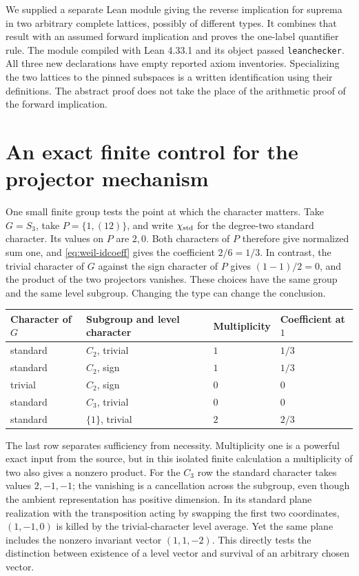 \documentclass[12pt,letterpaper]{article}
\begin{document}
We supplied a separate Lean module giving the reverse implication for suprema in two arbitrary complete lattices, possibly of different types. It combines that result with an assumed forward implication and proves the one-label quantifier rule. The module compiled with Lean 4.33.1 and its object passed \texttt{leanchecker}. All three new declarations have empty reported axiom inventories. Specializing the two lattices to the pinned subspaces is a written identification using their definitions. The abstract proof does not take the place of the arithmetic proof of the forward implication.


\section{An exact finite control for the projector mechanism}
\label{sec:weil-s3}

One small finite group tests the point at which the character matters. Take \(G=S_3\), take \(P=\{1,(12)\}\), and write \(\chi_{\rm std}\) for the degree-two standard character. Its values on \(P\) are \(2,0\). Both characters of \(P\) therefore give normalized sum one, and \eqref{eq:weil-idcoeff} gives the coefficient \(2/6=1/3\). In contrast, the trivial character of \(G\) against the sign character of \(P\) gives \((1-1)/2=0\), and the product of the two projectors vanishes. These choices have the same group and the same level subgroup. Changing the type can change the conclusion.

\begin{center}
\begin{tabular}{llll}
\hline
Character of \(G\)&Subgroup and level character&Multiplicity&Coefficient at \(1\)\\
\hline
standard&\(C_2\), trivial&\(1\)&\(1/3\)\\
standard&\(C_2\), sign&\(1\)&\(1/3\)\\
trivial&\(C_2\), sign&\(0\)&\(0\)\\
standard&\(C_3\), trivial&\(0\)&\(0\)\\
standard&\(\{1\}\), trivial&\(2\)&\(2/3\)\\
\hline
\end{tabular}
\end{center}

The last row separates sufficiency from necessity. Multiplicity one is a powerful exact input from the source, but in this isolated finite calculation a multiplicity of two also gives a nonzero product. For the \(C_3\) row the standard character takes values \(2,-1,-1\); the vanishing is a cancellation across the subgroup, even though the ambient representation has positive dimension. In its standard plane realization with the transposition acting by swapping the first two coordinates, \((1,-1,0)\) is killed by the trivial-character level average. Yet the same plane includes the nonzero invariant vector \((1,1,-2)\). This directly tests the distinction between existence of a level vector and survival of an arbitrary chosen vector.
\end{document}
